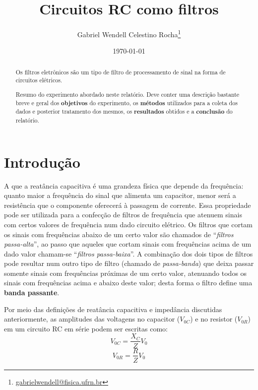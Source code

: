 \documentclass[letterpaper, 12pt]{article}
\begin{document}
\title{\bf Circuitos RC como filtros}
\author{Gabriel Wendell Celestino Rocha\footnote{\href{mailto:gabrielwendell@fisica.ufrn.br}{gabrielwendell@fisica.ufrn.br}}}
\date{\today}
\maketitle

\begin{abstract}
Os filtros eletrônicos são um tipo de filtro de processamento de sinal na forma de circuitos elétricos. 

Resumo do experimento abordado neste relatório. Deve conter uma descrição bastante breve e geral dos \textbf{objetivos} do experimento, os \textbf{métodos} utilizados para a coleta dos dados e posterior tratamento dos mesmos, os \textbf{resultados} obtidos e a \textbf{conclusão} do relatório.
\end{abstract}



\section{Introdução}\label{Sec 1 - Introdução}
A que a reatância capacitiva é uma grandeza física que depende da frequência: quanto maior a frequência do sinal que alimenta um capacitor, menor será a resistência que o componente oferecerá à passagem de corrente. Essa propriedade pode ser utilizada para a confecção de filtros de frequência que atenuem sinais com certos valores de frequência num dado circuito elétrico. Os filtros que cortam os sinais com frequências abaixo de um certo valor são chamados de “\textit{filtros passa-alta}”, ao passo que aqueles que cortam sinais com frequências acima de um dado valor chamam-se “\textit{filtros passa-baixa}”. A combinação dos dois tipos de filtros pode resultar num outro tipo de filtro (chamado de \textit{passa-banda}) que deixa passar somente sinais com frequências próximas de um certo valor, atenuando todos os sinais com frequências acima e abaixo deste valor; desta forma o filtro define uma \textbf{banda passante}.

Por meio das definições de reatância capacitiva e impedância discutidas anteriormente, as amplitudes das voltagens no capacitor ($V_{0C}$) e no resistor ($V_{0R}$) em um circuito RC em série podem ser escritas como:
\begin{equation}\label{V_0C - Introd.}
    V_{0C}=\frac{X_{C}}{Z}V_{0}
\end{equation}
\begin{equation}\label{V_0R - Introd.}
    V_{0R}=\frac{R}{Z}V_{0}
\end{equation}
\end{document}
